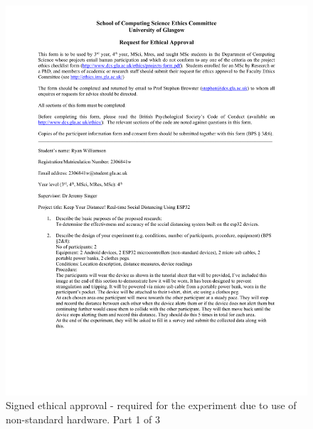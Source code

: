 \documentclass{l4proj}
\begin{document}
\begin{appendices}
    \begin{figure}[!htb]
        \centering
        \includegraphics[width=1.0\linewidth]{images/2306841w-ethics-approval 1.pdf}

        \caption{ Signed ethical approval - required for the experiment due to use of non-standard hardware. Part 1 of 3 }

        \label{fig:full_ethics_approval1}
    \end{figure}


\end{appendices}
\end{document}
